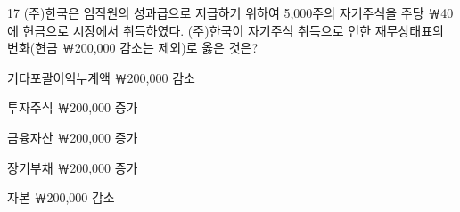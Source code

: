 \begin{question}{17}
(주)한국은 임직원의 성과급으로 지급하기 위하여 5,000주의 자기주식을 주당 ￦40에 현금으로 시장에서 취득하였다. (주)한국이 자기주식 취득으로 인한 재무상태표의 변화(현금 ￦200,000 감소는 제외)로 옳은 것은?
\begin{choices}
  \item 기타포괄이익누계액 ￦200,000 감소
  \item 투자주식 ￦200,000 증가
  \item 금융자산 ￦200,000 증가
  \item 장기부채 ￦200,000 증가
  \item 자본 ￦200,000 감소
\end{choices}
\end{question}
